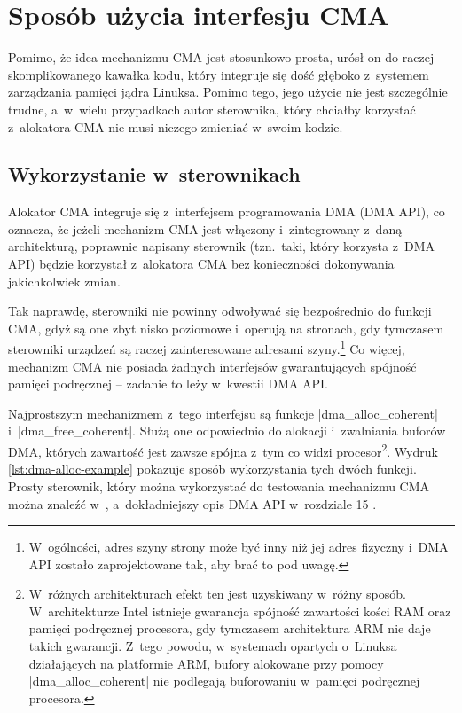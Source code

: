 \chapter{Sposób użycia interfesju CMA}\label{sec:cma-usage}

Pomimo, że idea mechanizmu CMA jest stosunkowo prosta, urósł on do
raczej skomplikowanego kawałka kodu, który integruje się dość głęboko
z~systemem zarządzania pamięci jądra Linuksa.  Pomimo tego, jego
użycie nie jest szczególnie trudne, a~w~wielu przypadkach autor
sterownika, który chciałby korzystać z~alokatora CMA nie musi niczego
zmieniać w~swoim kodzie.

\section{Wykorzystanie w~sterownikach}\label{sec:usage-drivers}

Alokator CMA integruje się z~interfejsem programowania DMA (DMA API),
co oznacza, że jeżeli mechanizm CMA jest włączony i~zintegrowany
z~daną architekturą, poprawnie napisany sterownik (tzn.\ taki, który
korzysta z~DMA API) będzie korzystał z~alokatora CMA bez konieczności
dokonywania jakichkolwiek zmian.

Tak naprawdę, sterowniki nie powinny odwoływać się bezpośrednio do
funkcji CMA, gdyż są one zbyt nisko poziomowe i~operują na stronach,
gdy tymczasem sterowniki urządzeń są raczej zainteresowane adresami
szyny.\footnote{W~ogólności, adres szyny strony może być inny niż jej
  adres fizyczny i~DMA API zostało zaprojektowane tak, aby brać to pod
  uwagę.}  Co więcej, mechanizm CMA nie posiada żadnych interfejsów
gwarantujących spójność pamięci podręcznej -- zadanie to leży
w~kwestii DMA API.

Najprostszym mechanizmem z~tego interfejsu są funkcje
\code|dma_alloc_coherent| i~\code|dma_free_coherent|.  Służą one
odpowiednio do alokacji i~zwalniania buforów DMA, których zawartość
jest zawsze spójna z~tym co widzi procesor\footnote{W~różnych
  architekturach efekt ten jest uzyskiwany w~różny sposób.
  W~architekturze Intel istnieje gwarancja spójność zawartości kości
  RAM oraz pamięci podręcznej procesora, gdy tymczasem architektura
  ARM nie daje takich gwarancji.  Z~tego powodu, w~systemach opartych
  o~Linuksa działających na platformie ARM, bufory alokowane przy
  pomocy \code|dma_alloc_coherent| nie podlegają buforowaniu w~pamięci
  podręcznej procesora.}.  Wydruk \ref{lst:dma-alloc-example} pokazuje
sposób wykorzystania tych dwóch funkcji.  Prosty sterownik, który
można wykorzystać do testowania mechanizmu CMA można znaleźć
w~\cite{patch:cma-test}, a~dokładniejszy opis DMA API w~rozdziale 15
\cite{bib:ldd3}.

